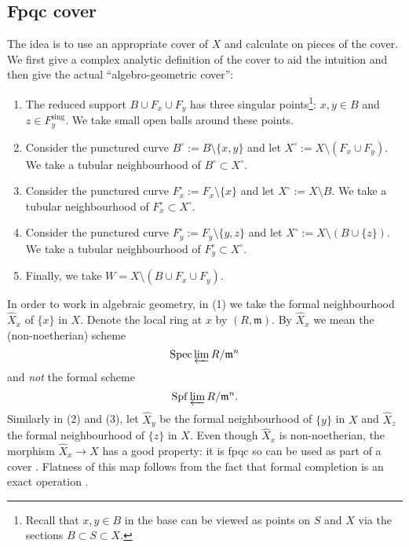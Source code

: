 \documentclass{amsart}
\theoremstyle{definition}
\newcommand{\Spec}{\operatorname{Spec}}
\newcommand{\sing}{\operatorname{sing}}
\newcommand{\Xhat}{\widehat{X}}
\begin{document}
\subsection{Fpqc cover}

The idea is to use an appropriate cover of $X$ and calculate on pieces of the cover. We first give a complex analytic definition of the cover to aid the intuition and then give the actual ``algebro-geometric cover'': 
\begin{enumerate}
\item The reduced support $B \cup F_x \cup F_y$ has three singular points\footnote{Recall that $x,y \in B$ in the base can be viewed as points on $S$ and $X$ via the sections $B \subset S \subset X$.}: $x,y \in B$ and $z \in F^{\sing}_{y}$. We take small open balls around these points.
\item Consider the punctured curve $B^\circ := B \setminus \{x,y\}$ and let $X^\circ := X \setminus (F_x  \cup F_y)$. We take a tubular neighbourhood of $B^\circ \subset X^\circ$.
\item Consider the punctured curve $F_{x}^{\circ} := F_x \setminus \{x\}$ and let $X^\circ := X \setminus B$. We take a tubular neighbourhood of $F_{x}^\circ \subset X^\circ$.
\item Consider the punctured curve $F_{y}^{\circ} := F_y \setminus \{y,z\}$ and let $X^\circ := X \setminus (B \cup \{z\})$. We take a tubular neighbourhood of $F_{y}^{\circ} \subset X^\circ$.
\item Finally, we take $W = X \setminus (B \cup F_x \cup F_y)$. 
\end{enumerate}

In order to work in algebraic geometry, in (1) we take the formal
neighbourhood $\Xhat _x$ of $\{x\}$ in $X$. Denote the local ring at
$x$ by $(R,\mathfrak{m})$. By $\Xhat _x$ we mean the (non-noetherian)
scheme
$$
\Spec \varprojlim R / \mathfrak{m}^n 
$$
and \emph{not} the formal scheme $$\mathrm{Spf} \varprojlim R /
\mathfrak{m}^n.$$ Similarly in (2) and (3), let $\Xhat _y$ be the
formal neighbourhood of $\{y\}$ in $X$ and $\Xhat _z$ the formal
neighbourhood of $\{z\}$ in $X$.  Even though $\Xhat _x$ is
non-noetherian, the morphism $\Xhat _x \rightarrow X$ has a good
property: it is fpqc so can be used as part of a cover \cite[Vistoli,
Sect.~2.3.2]{Fundamental-algebraic-geometry}. Flatness of this map
follows from the fact that formal completion is an exact operation
\cite[Tag 0BNH]{stacks-project} \cite[Prop.~10.14]{Atiyah-Macdonald}.
\end{document}
